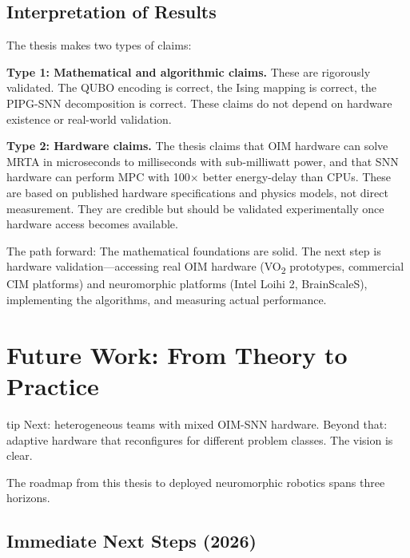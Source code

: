 \subsection{Interpretation of Results}

The thesis makes two types of claims:

\textbf{Type 1: Mathematical and algorithmic claims.} These are rigorously validated. The QUBO encoding is correct, the Ising mapping is correct, the PIPG-SNN decomposition is correct. These claims do not depend on hardware existence or real-world validation.

\textbf{Type 2: Hardware claims.} The thesis claims that OIM hardware can solve MRTA in microseconds to milliseconds with sub-milliwatt power, and that SNN hardware can perform MPC with 100$\times$ better energy-delay than CPUs. These are based on published hardware specifications and physics models, not direct measurement. They are credible but should be validated experimentally once hardware access becomes available.

The path forward: The mathematical foundations are solid. The next step is hardware validation---accessing real OIM hardware (VO\textsubscript{2} prototypes, commercial CIM platforms) and neuromorphic platforms (Intel Loihi 2, BrainScaleS), implementing the algorithms, and measuring actual performance.

\section{Future Work: From Theory to Practice}
\begin{block}{tip}
Next: heterogeneous teams with mixed OIM-SNN hardware. Beyond that: adaptive hardware that reconfigures for different problem classes. The vision is clear.
\end{block}


The roadmap from this thesis to deployed neuromorphic robotics spans three horizons.

\subsection{Immediate Next Steps (2026)}

